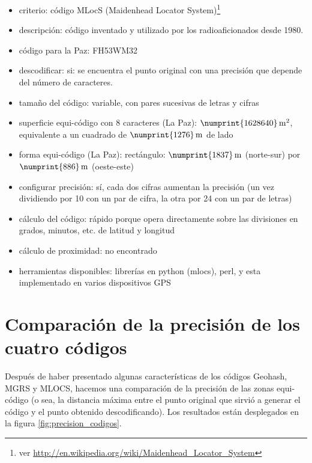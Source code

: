 \documentclass[letterpaper]{article}
\begin{document}
\begin{itemize}
	\item criterio: código MLocS (Maidenhead Locator System)\footnote{ver 
		\url{http://en.wikipedia.org/wiki/Maidenhead_Locator_System}} 
	\item
		descripción: código inventado y utilizado por los
		radioaficionados desde 1980.
	\item código para la Paz: FH53WM32 
	\item descodificar: si: se encuentra el punto original con una 
		precisión que depende del número de caracteres. 
	\item tamaño del código: variable, con pares sucesivas de letras y
		cifras 
	\item superficie equi-código con 8 caracteres (La Paz): 
		\(\numprint{1628640}\,\mathrm{m^{2}}\), 
		equivalente a un cuadrado de \(\numprint{1276}\,\mathrm{m}\) de lado 
	\item forma equi-código (La Paz): rectángulo: 
		\(\numprint{1837}\,\mathrm{m}\) (norte-sur) por 
		\(\numprint{886}\,\mathrm{m}\) (oeste-este) 
	\item configurar precisión: sí, cada dos 
		cifras aumentan la precisión (un vez dividiendo por 10 con
		un par de cifra, la otra por 24 con un par de letras) 
	\item cálculo del código: rápido porque opera directamente sobre
		las divisiones en grados, minutos, etc. de latitud y longitud 
	\item cálculo de proximidad: no encontrado 
	\item herramientas disponibles: librerías en python (mlocs), perl, 
		y esta implementado en varios dispositivos GPS 
\end{itemize}

\section{Comparación de la precisión de los cuatro códigos}
\label{sec:precision}

Después de haber presentado algunas características de los códigos 
Geohash, MGRS y MLOCS, hacemos una comparación de la precisión de las 
zonas equi-código (o sea, la distancia máxima entre el punto original 
que sirvió a generar el código y el punto obtenido descodificando). 
Los resultados están desplegados en la figura 
\ref{fig:precision_codigos}.
\end{document}
